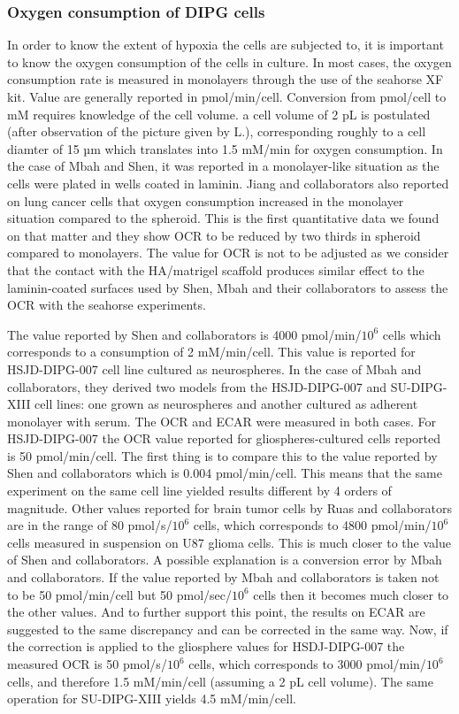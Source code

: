 \documentclass[11pt,a4paper]{article}
\begin{document}
\subsubsection{Oxygen consumption of DIPG cells}
In order to know the extent of hypoxia the cells are subjected to, it is important to know the oxygen consumption of the cells in culture. In most cases, the oxygen consumption rate is measured in monolayers through the use of the seahorse XF kit.\cite{RomeroAgilent} Value are generally reported in pmol/min/cell. Conversion from pmol/cell to mM requires knowledge of the cell volume. a cell volume of 2 pL is postulated (after observation of the picture given by L.), corresponding roughly to a cell diamter of 15 µm which translates into 1.5 mM/min for oxygen consumption. In the case of Mbah and Shen, it was reported in a monolayer-like situation as the cells were plated in wells coated in laminin.  Jiang and collaborators also reported on lung cancer cells that oxygen consumption increased in the monolayer situation compared to the spheroid. This is the first quantitative data we found on that matter and they show OCR to be reduced by two thirds in spheroid compared to monolayers.\cite{Jiang2016} The value for OCR is not to be adjusted as we consider that the contact with the HA/matrigel scaffold produces similar effect to the laminin-coated surfaces used by Shen, Mbah and their collaborators to assess the OCR with the seahorse experiments.

The value reported by Shen and collaborators is 4000 pmol/min/$10^6$ cells which corresponds to a consumption of 2 mM/min/cell. This value is reported for HSJD-DIPG-007 cell line cultured as neurospheres.\cite{Shen2019} In the case of Mbah and collaborators, they derived two models from the HSJD-DIPG-007 and SU-DIPG-XIII cell lines: one grown as neurospheres and another cultured as adherent monolayer with serum. The OCR and ECAR were measured in both cases. For HSJD-DIPG-007 the OCR value reported for gliospheres-cultured cells reported is 50 pmol/min/cell. The first thing is to compare this to the value reported by Shen and collaborators which is 0.004 pmol/min/cell. This means that the same experiment on the same cell line yielded results different by 4 orders of magnitude. Other values reported for brain tumor cells by Ruas and collaborators are in the range of 80 pmol/s/$10^6$ cells, which corresponds to 4800 pmol/min/$10^6$ cells measured in suspension on U87 glioma cells. This is much closer to the value of Shen and collaborators. A possible explanation is a conversion error by Mbah and collaborators. If the value reported by Mbah and collaborators is taken not to be 50 pmol/min/cell but 50 pmol/sec/$10^6$ cells then it becomes much closer to the other values. And to further support this point, the results on ECAR are suggested to the same discrepancy and can be corrected in the same way. Now, if the correction is applied to the gliosphere values for HSDJ-DIPG-007 the measured OCR is 50 pmol/s/$10^6$ cells, which corresponds to 3000 pmol/min/$10^6$ cells, and therefore 1.5 mM/min/cell (assuming a 2 pL cell volume). The same operation for SU-DIPG-XIII yields 4.5 mM/min/cell.
\end{document}
